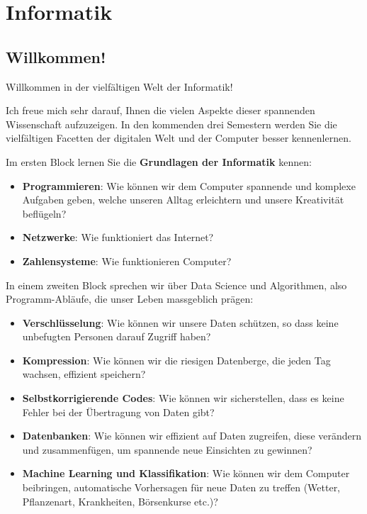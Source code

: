\section*{Informatik}

\subsection*{Willkommen!}
Willkommen in der vielfältigen Welt der Informatik!  

Ich freue mich sehr darauf, Ihnen die vielen Aspekte dieser spannenden Wissenschaft aufzuzeigen. In den kommenden drei Semestern werden Sie die vielfältigen Facetten der digitalen Welt und der Computer besser kennenlernen. 

Im ersten Block lernen Sie die \textbf{Grundlagen der Informatik} kennen:
\begin{itemize}
\item \textbf{Programmieren}: Wie können wir dem Computer spannende und komplexe Aufgaben geben, welche unseren Alltag erleichtern und unsere Kreativität beflügeln?
\item \textbf{Netzwerke}: Wie funktioniert das Internet?
\item \textbf{Zahlensysteme}: Wie funktionieren Computer? 
\end{itemize}

In einem zweiten Block sprechen wir über Data Science und Algorithmen, also Programm-Abläufe, die unser Leben massgeblich prägen:
\begin{itemize}
\item \textbf{Verschlüsselung}: Wie können wir unsere Daten schützen, so dass keine unbefugten Personen darauf Zugriff haben?
\item \textbf{Kompression}: Wie können wir die riesigen Datenberge, die jeden Tag wachsen, effizient speichern?
\item \textbf{Selbstkorrigierende Codes}: Wie können wir sicherstellen, dass es keine Fehler bei der Übertragung von Daten gibt?
\item \textbf{Datenbanken}: Wie können wir effizient auf Daten zugreifen, diese verändern und zusammenfügen, um spannende neue Einsichten zu gewinnen?
\item \textbf{Machine Learning und Klassifikation}: Wie können wir dem Computer beibringen, automatische Vorhersagen für neue Daten zu treffen (Wetter, Pflanzenart, Krankheiten, Börsenkurse etc.)?
\end{itemize}

